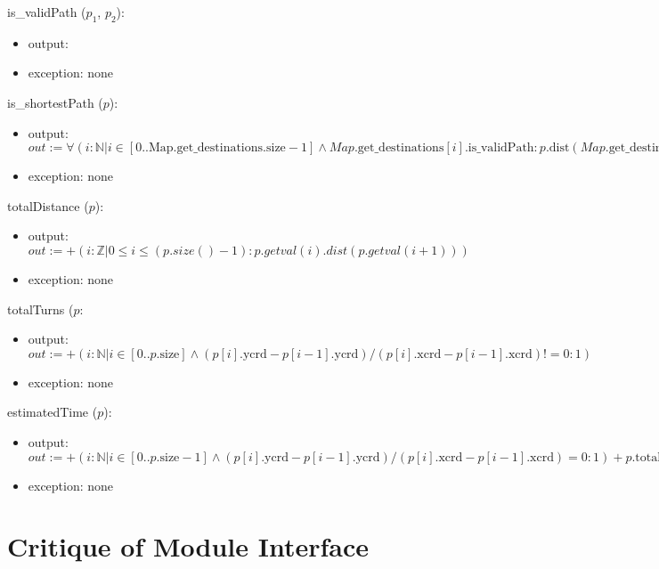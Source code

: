 \documentclass[12pt]{article}
\begin{document}
\noindent  is\_validPath ($p_1$, $p_2$):
\begin{itemize}
\item output: $ $
\item exception: none
\end{itemize}

\noindent  is\_shortestPath ($p$):
\begin{itemize}
\item output: $\mathit{out} := \forall(i: \mathbb{N} | i \in [0 .. \mbox{Map.get\_destinations}.\mbox{size} - 1] \land Map.\mbox{get\_destinations}[i].\mbox{is\_validPath} : p.\mbox{dist}(Map.\mbox{get\_destinations}[i].\mbox{getval}) < p.\mbox{dist}(Map.\mbox{get\_destinations}[i+1].\mbox{getval})) $
\item exception: none
\end{itemize}

\noindent  totalDistance ($p$):
\begin{itemize}
\item output: $\mathit{out} := +(i:\mathbb{Z} | 0 \leq i \leq (p.size()-1):p.getval(i).dist(p.getval(i+1)))$
\item exception: none
\end{itemize}

\noindent  totalTurns ($p$:
\begin{itemize}
\item output: $\mathit{out} := +(i : \mathbb{N} | i \in [0 .. p.\mbox{size}] \land  (p[i].\mbox{ycrd} - p[i-1].\mbox{ycrd} )/ (p[i].\mbox{xcrd} - p[i-1].\mbox{xcrd}) != 0 : 1)$
\item exception: none
\end{itemize}

\noindent  estimatedTime ($p$):
\begin{itemize}
\item output: $\mathit{out} := +(i : \mathbb{N} |  i \in [0 .. p.\mbox{size} -1] \land  (p[i].\mbox{ycrd} - p[i-1].\mbox{ycrd} )/ (p[i].\mbox{xcrd} - p[i-1].\mbox{xcrd}) = 0 : 1 ) + p.\mbox{totalTurns}$
\item exception: none
\end{itemize}



\newpage
\section{Critique of Module Interface}
\end{document}
